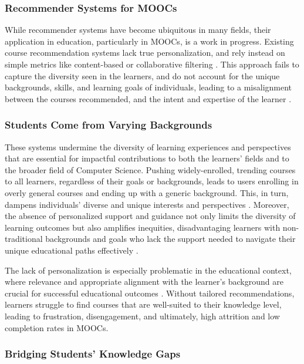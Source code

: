 \subsubsection{Recommender Systems for MOOCs} 

While recommender systems have become ubiquitous in many fields, their application in education, particularly in MOOCs, is a work in progress. Existing course recommendation systems lack true personalization, and rely instead on simple metrics like content-based or collaborative filtering \cite{deschenes_recommender_2020} \cite{da_silva_systematic_2023} \cite{khalid_recommender_2020}. This approach fails to capture the diversity seen in the learners, and do not account for the unique backgrounds, skills, and learning goals of individuals, leading to a misalignment between the courses recommended, and the intent and expertise of the learner \cite{noauthor_reinforced_nodate}.

\subsubsection{Students Come from Varying Backgrounds}

These systems undermine the diversity of learning experiences and perspectives that are essential for impactful contributions to both the learners' fields and to the broader field of Computer Science. Pushing widely-enrolled, trending courses to all learners, regardless of their goals or backgrounds, leads to users enrolling in overly general courses and ending up with a generic background. This, in turn, dampens individuals’ diverse and unique interests and perspectives \cite{noauthor_2022_nodate}. Moreover, the absence of personalized support and guidance not only limits the diversity of learning outcomes but also amplifies inequities, disadvantaging learners with non-traditional backgrounds and goals who lack the support needed to navigate their unique educational paths effectively \cite{dumont_promise_2023}.

The lack of personalization is especially problematic in the educational context, where relevance and appropriate alignment with the learner's background are crucial for successful educational outcomes \cite{noauthor_building_2017}. Without tailored recommendations, learners struggle to find courses that are well-suited to their knowledge level, leading to frustration, disengagement, and ultimately, high attrition and low completion rates in MOOCs.

\subsubsection{Bridging Students' Knowledge Gaps}

